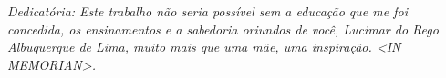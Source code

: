 \documentclass[
	12pt,				%
	openright,			%
	oneside,			%
	a4paper,			%
	english,			%
	french,				%
	spanish,			%
	brazil				%
	]{abntex2}
\begin{document}
%


%	
\clearpage
\begin{dedicatoria}
   \vspace*{\fill}
   \centering
   \noindent
   \textit{ Dedicat\'oria: Este trabalho não seria possível sem a educação que me foi concedida, os ensinamentos e a sabedoria oriundos de você, Lucimar do Rego Albuquerque de Lima, muito mais que uma mãe, uma inspiração. <IN MEMORIAN>.} \vspace*{\fill}
\end{dedicatoria}
\end{document}
